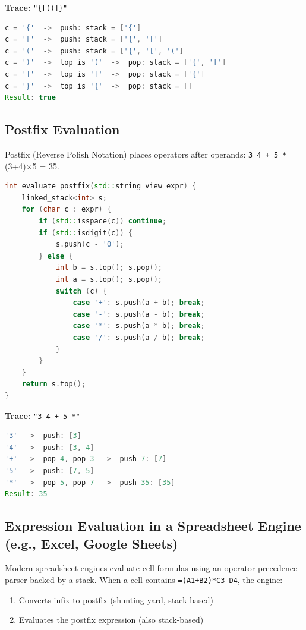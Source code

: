 \textbf{Trace:} \texttt{"\{[()]\}"}

\begin{lstlisting}[language=Java]
c = '{'  ->  push: stack = ['{']
c = '['  ->  push: stack = ['{', '[']
c = '('  ->  push: stack = ['{', '[', '(']
c = ')'  ->  top is '('  ->  pop: stack = ['{', '[']
c = ']'  ->  top is '['  ->  pop: stack = ['{']
c = '}'  ->  top is '{'  ->  pop: stack = []
Result: true
\end{lstlisting}

\subsection{Postfix Evaluation}

Postfix (Reverse Polish Notation) places operators after operands: \texttt{3 4 + 5 *} = (3+4)$\times $5 = 35.

\begin{lstlisting}[language=C++]
int evaluate_postfix(std::string_view expr) {
    linked_stack<int> s;
    for (char c : expr) {
        if (std::isspace(c)) continue;
        if (std::isdigit(c)) {
            s.push(c - '0');
        } else {
            int b = s.top(); s.pop();
            int a = s.top(); s.pop();
            switch (c) {
                case '+': s.push(a + b); break;
                case '-': s.push(a - b); break;
                case '*': s.push(a * b); break;
                case '/': s.push(a / b); break;
            }
        }
    }
    return s.top();
}
\end{lstlisting}

\textbf{Trace:} \texttt{"3 4 + 5 *"}

\begin{lstlisting}[language=Java]
'3'  ->  push: [3]
'4'  ->  push: [3, 4]
'+'  ->  pop 4, pop 3  ->  push 7: [7]
'5'  ->  push: [7, 5]
'*'  ->  pop 5, pop 7  ->  push 35: [35]
Result: 35
\end{lstlisting}

\subsection{Expression Evaluation in a Spreadsheet Engine (e.g., Excel, Google Sheets)}

Modern spreadsheet engines evaluate cell formulas using an operator-precedence parser backed by a stack. When a cell contains \texttt{=(A1+B2)*C3-D4}, the engine:

\begin{enumerate}
\item Converts infix to postfix (shunting-yard, stack-based)
\item Evaluates the postfix expression (also stack-based)
\end{enumerate}

